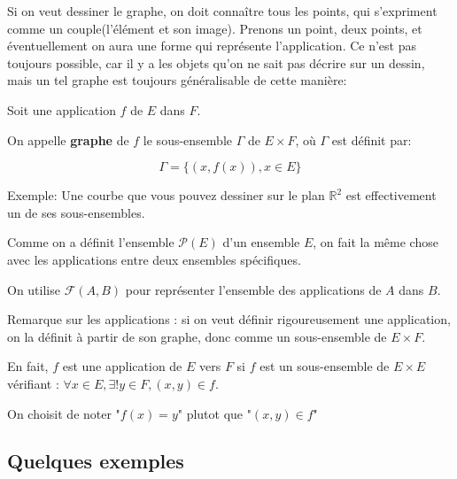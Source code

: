 \documentclass{article}
\begin{document}
Si on veut dessiner le graphe, on doit connaître tous les points, qui s'expriment comme un couple(l'élément et son image). Prenons un point, deux points, et éventuellement on aura une forme qui représente l'application. Ce n'est pas toujours possible, car il y a les objets qu'on ne sait pas décrire sur un dessin, mais un tel graphe est toujours généralisable de cette manière:

 \begin{tcolorbox}[colback=red!5!white,colframe=red!75!black,title=Définition 3.2]

Soit une application $f$ de $E$ dans $F$.

On appelle \textbf{graphe} de $f$ le sous-ensemble $\Gamma$ de $E \times F$, où $\Gamma$ est définit par: 

\[
\Gamma = \{(x, f(x)), x \in E\}
\]
\end{tcolorbox}

Exemple: Une courbe que vous pouvez dessiner sur le plan $\mathbb{R}^{2}$ est effectivement un de ses sous-ensembles.

Comme on a définit l'ensemble $\mathcal{P}(E)$ d'un ensemble $E$, on fait la même chose avec les applications entre deux ensembles spécifiques.

\begin{tcolorbox}[colback=yellow!5!white,colframe=yellow!75!black,title=Notation 3.2]

On utilise $\mathcal{F}(A,B)$ pour représenter l'ensemble des applications de $A$ dans $B$.


\end{tcolorbox}


\begin{tcolorbox}[colback=purple!5!white,colframe=purple!75!black,title=Remarque importante]

Remarque sur les applications : si on veut définir rigoureusement une application, on la définit à partir de son graphe, donc comme un sous-ensemble de $E \times F$. 

En fait, $f$ est une application de $E$ vers $F$ si $f$ est un sous-ensemble de $E \times E$ vérifiant :
$\forall x \in E, \exists ! y \in F, (x,y) \in f$.

On choisit de noter "$f(x)=y$" plutot que "$(x,y) \in f$"


\end{tcolorbox}


\subsection{Quelques exemples}
\end{document}
